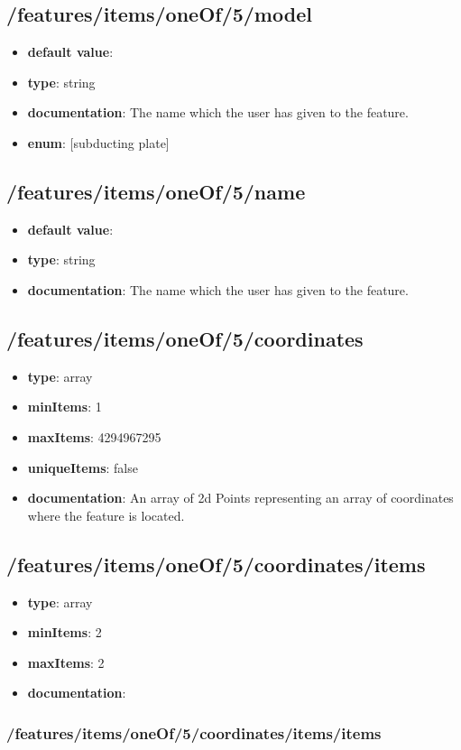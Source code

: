 \subsection{/features/items/oneOf/5/model}
\begin{itemize}\item {\bf default value}: 
\item {\bf type}: string
\item {\bf documentation}: The name which the user has given to the feature.
\item {\bf enum}: [subducting plate]\end{itemize}\subsection{/features/items/oneOf/5/name}
\begin{itemize}\item {\bf default value}: 
\item {\bf type}: string
\item {\bf documentation}: The name which the user has given to the feature.
\end{itemize}\subsection{/features/items/oneOf/5/coordinates}
\begin{itemize}\item {\bf type}: array
\item {\bf minItems}: 1
\item {\bf maxItems}: 4294967295
\item {\bf uniqueItems}: false
\item {\bf documentation}: An array of 2d Points representing an array of coordinates where the feature is located.
\end{itemize}\subsection{/features/items/oneOf/5/coordinates/items}
\begin{itemize}\item {\bf type}: array
\item {\bf minItems}: 2
\item {\bf maxItems}: 2
\item {\bf documentation}: 
\end{itemize}\subsubsection{/features/items/oneOf/5/coordinates/items/items}
